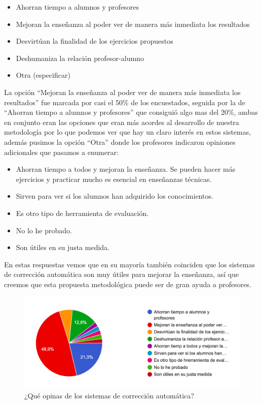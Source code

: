 \begin{enumerate}
\begin{itemize}
    \item Ahorran tiempo a alumnos y profesores
    \item Mejoran la enseñanza al poder ver de manera más inmediata los resultados
    \item Desvirtúan la finalidad de los ejercicios propuestos
    \item Deshumaniza la relación profesor-alumno
    \item Otra (especificar)
\end{itemize}

La opción ``Mejoran la enseñanza al poder ver de manera más inmediata los resultados'' fue marcada por casi el 50\% de los encuestados, seguida por la de ``Ahorran tiempo a alumnos y profesores'' que consiguió algo mas del 20\%, ambas en conjunto eran las opciones que eran más acordes al desarrollo de nuestra metodología por lo que podemos ver que hay un claro interés en estos sistemas, además pusimos la opción ``Otra'' donde los profesores indicaron opiniones adicionales que pasamos a enumerar:

\begin{itemize}
    \item Ahorran tiempo a todos y mejoran la enseñanza. Se pueden hacer más ejercicios y practicar mucho es esencial en enseñanzas técnicas.
    \item Sirven para ver si los alumnos han adquirido los conocimientos.
    \item Es otro tipo de herramienta de evaluación.
    \item No lo he probado.
    \item Son útiles en su justa medida.
\end{itemize}

En estas respuestas vemos que en su mayoría también coinciden que los sistemas de corrección automática son muy útiles para mejorar la enseñanza, así que creemos que esta propuesta metodológica puede ser de gran ayuda a profesores.

\begin{figure}[H]
\centering
\includegraphics[width=1.0\textwidth]{../images/quiz_6}
\caption{¿Qué opinas de los sistemas de corrección automática?}
\label{fig:quiz_6}
\end{figure}


\end{enumerate}
